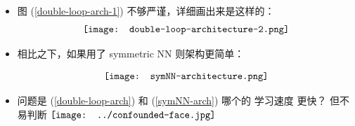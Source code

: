 \documentclass[15pt]{beamer}
\newcommand{\cc}[2]{#1}
\newcommand{\cc}[2]{#2}
\newcommand{\emp}[1]{{\color{violet}#1}}
\newcommand*\confoundFace{$\vcenter{\hbox{\texttt{[image: ../confounded-face.jpg]}}}$}
\begin{document}
\begin{frame}[plain]
\begin{itemize}
	\item \cc{
	图 (\ref{double-loop-arch-1}) 不够严谨，详细画出来是这样的：}{
	Diagram (\ref{double-loop-arch-1}) is a bit inaccurate, here is a more detailed diagram:
	}
	\begin{equation}
		\label{double-loop-arch}
		\vcenter{\hbox{\texttt{[image: double-loop-architecture-2.png]}}}
	\end{equation}

	\item \cc{
	相比之下，如果用了 symmetric NN 则架构更简单：}{
	In contrast, one can use a \emp{symmetric NN} to make the architecture even simpler:
	}
	
	\begin{equation}
		\label{symNN-arch}
		\vcenter{\hbox{\texttt{[image: symNN-architecture.png]}}}
	\end{equation}

	\item \cc{
	问题是 (\ref{double-loop-arch}) 和 (\ref{symNN-arch}) 哪个的 学习速度 更快？  但不易判断 \confoundFace}{
	But it's not easy to decide whether (\ref{double-loop-arch}) or (\ref{symNN-arch}) learns faster \confoundFace
	}
	
\end{itemize}
\end{frame}
\end{document}
